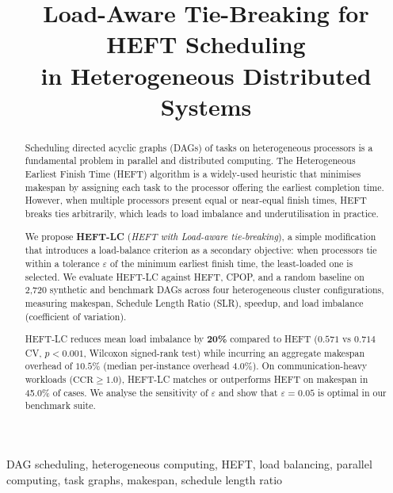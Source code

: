 \documentclass[conference]{IEEEtran}
\begin{document}
\title{Load-Aware Tie-Breaking for HEFT Scheduling\\
in Heterogeneous Distributed Systems}

\author{
}

\maketitle

\begin{abstract}
Scheduling directed acyclic graphs (DAGs) of tasks on heterogeneous
processors is a fundamental problem in parallel and distributed computing.
The Heterogeneous Earliest Finish Time (HEFT) algorithm is a widely-used
heuristic that minimises makespan by assigning each task to the processor
offering the earliest completion time. However, when multiple processors
present equal or near-equal finish times, HEFT breaks ties arbitrarily,
which leads to load imbalance and underutilisation in practice.

We propose \textbf{HEFT-LC} (\textit{HEFT with Load-aware tie-breaking}),
a simple modification that introduces a load-balance criterion as a
secondary objective: when processors tie within a tolerance $\varepsilon$
of the minimum earliest finish time, the least-loaded one is selected.
We evaluate HEFT-LC against HEFT, CPOP, and a random baseline on 2{,}720
synthetic and benchmark DAGs across four heterogeneous cluster
configurations, measuring makespan, Schedule Length Ratio (SLR), speedup,
and load imbalance (coefficient of variation).

HEFT-LC reduces mean load imbalance by \textbf{20\%} compared to HEFT
($0.571$ vs $0.714$ CV, $p < 0.001$, Wilcoxon signed-rank test) while
incurring an aggregate makespan overhead of $10.5\%$ (median per-instance overhead $4.0\%$). On
communication-heavy workloads ($\text{CCR} \geq 1.0$), HEFT-LC matches
or outperforms HEFT on makespan in 45.0\% of cases. We analyse the
sensitivity of $\varepsilon$ and show that $\varepsilon = 0.05$ is
optimal in our benchmark suite.
\end{abstract}

\begin{IEEEkeywords}
DAG scheduling, heterogeneous computing, HEFT, load balancing,
parallel computing, task graphs, makespan, schedule length ratio
\end{IEEEkeywords}
\end{document}
